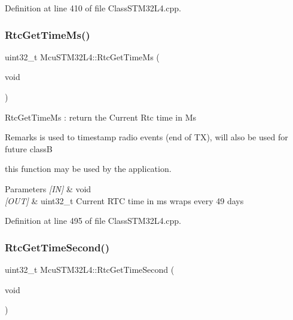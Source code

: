 Definition at line 410 of file Class\+S\+T\+M32\+L4.\+cpp.

\mbox{\label{class_mcu_s_t_m32_l4_a71dae6a30ca01e74a880313dfb9411b0}} 
\subsubsection{\texorpdfstring{Rtc\+Get\+Time\+Ms()}{RtcGetTimeMs()}}
{\footnotesize\ttfamily uint32\+\_\+t Mcu\+S\+T\+M32\+L4\+::\+Rtc\+Get\+Time\+Ms (\begin{DoxyParamCaption}\item[{void}]{ }\end{DoxyParamCaption})}

Rtc\+Get\+Time\+Ms \+: return the Current Rtc time in Ms \begin{DoxyRemark}{Remarks}
is used to timestamp radio events (end of TX), will also be used for future classB 

this function may be used by the application. 
\end{DoxyRemark}

\begin{DoxyParams}{Parameters}
{\em \mbox{[}\+I\+N\mbox{]}} & void \\
\hline
{\em \mbox{[}\+O\+U\+T\mbox{]}} & uint32\+\_\+t Current R\+TC time in ms wraps every 49 days \\
\hline
\end{DoxyParams}


Definition at line 495 of file Class\+S\+T\+M32\+L4.\+cpp.

\mbox{\label{class_mcu_s_t_m32_l4_a193ea0ee797296bfd537bc64d36dea04}} 
\subsubsection{\texorpdfstring{Rtc\+Get\+Time\+Second()}{RtcGetTimeSecond()}}
{\footnotesize\ttfamily uint32\+\_\+t Mcu\+S\+T\+M32\+L4\+::\+Rtc\+Get\+Time\+Second (\begin{DoxyParamCaption}\item[{void}]{ }\end{DoxyParamCaption})}

